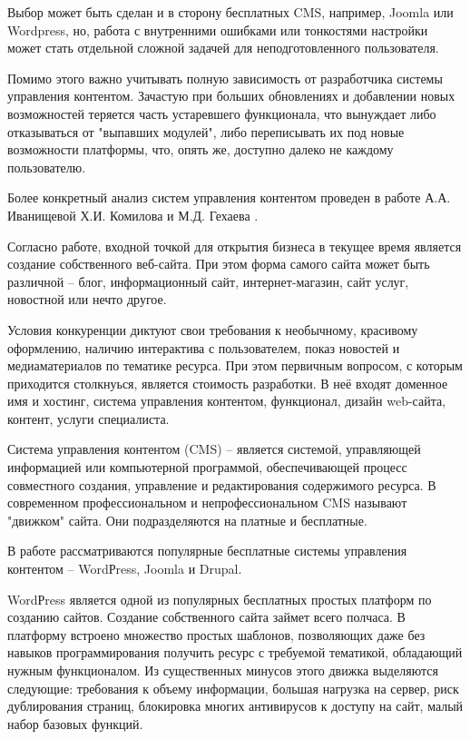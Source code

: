 Выбор может быть сделан и в сторону бесплатных CMS, например, Joomla или Wordpress, но, работа с внутренними ошибками или тонкостями настройки может стать отдельной сложной задачей для неподготовленного пользователя.

Помимо этого важно учитывать полную зависимость от разработчика системы управления контентом.
Зачастую при больших обновлениях и добавлении новых возможностей теряется часть устаревшего функционала, что вынуждает либо отказываться от "выпавших модулей", либо переписывать их под новые возможности платформы, что, опять же, доступно далеко не каждому пользователю.

Более конкретный анализ систем управления контентом проведен в работе А.А. Иванищевой Х.И. Комилова и М.Д. Гехаева \cite{ivanisheva-cms}.

Согласно работе, входной точкой для открытия бизнеса в текущее время является создание собственного веб-сайта.
При этом форма самого сайта может быть различной -- блог, информационный сайт, интернет-магазин, сайт услуг, новостной или нечто другое.

Условия конкуренции диктуют свои требования к необычному, красивому оформлению, наличию интерактива с пользователем, показ новостей и медиаматериалов по тематике ресурса.
При этом первичным вопросом, с которым приходится столкнуься, является стоимость разработки.
В неё входят доменное имя и хостинг, система управления контентом, функционал, дизайн web-сайта, контент, услуги специалиста.

Система управления контентом (CMS) -- является системой, управляющей информацией или компьютерной программой, обеспечивающей процесс совместного создания, управление и редактирования содержимого ресурса.
В современном профессиональном и непрофессиональном CMS называют "движком" сайта.
Они подразделяются на платные и бесплатные.

В работе рассматриваются популярные бесплатные системы управления контентом -- WordРress, Joomla
и Drupal.

WordРress является одной из популярных бесплатных простых платформ по созданию сайтов.
Создание собственного сайта займет всего полчаса.
В платформу встроено множество простых шаблонов, позволяющих даже без навыков программирования получить ресурс с требуемой тематикой, обладающий нужным функционалом.
Из существенных минусов этого движка выделяются следующие: требования к объему информации, большая нагрузка на сервер, риск дублирования страниц, блокировка многих антивирусов к доступу на сайт, малый набор базовых функций.

